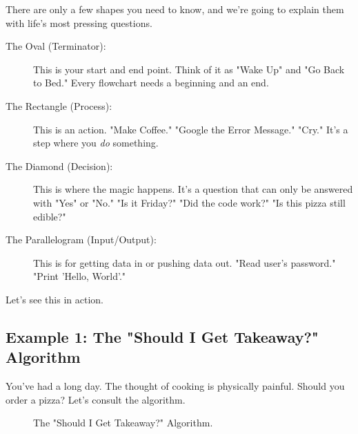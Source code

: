 \documentclass[11pt, letterpaper, openany]{book}
\begin{document}
There are only a few shapes you need to know, and we're going to explain them with life's most pressing questions.

\begin{description}
    \item[The Oval (Terminator):] This is your start and end point. Think of it as "Wake Up" and "Go Back to Bed." Every flowchart needs a beginning and an end.
    \item[The Rectangle (Process):] This is an action. "Make Coffee." "Google the Error Message." "Cry." It's a step where you \emph{do} something.
    \item[The Diamond (Decision):] This is where the magic happens. It's a question that can only be answered with "Yes" or "No." "Is it Friday?" "Did the code work?" "Is this pizza still edible?"
    \item[The Parallelogram (Input/Output):] This is for getting data in or pushing data out. "Read user's password." "Print 'Hello, World'."
\end{description}

Let's see this in action.

\subsection{Example 1: The "Should I Get Takeaway?" Algorithm}

You've had a long day. The thought of cooking is physically painful. Should you order a pizza? Let's consult the algorithm.

\begin{figure}[h!]
\centering
{}
\caption{The "Should I Get Takeaway?" Algorithm.}
\end{figure}
\end{document}
